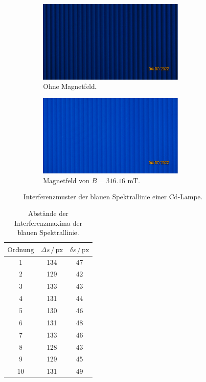 \begin{figure}[H]
	\centering
	\begin{subfigure}[b]{0.8\textwidth}
		\centering
		\includegraphics[width=0.8\textwidth]{data/blau1.JPG}
		\caption{Ohne Magnetfeld.}
    \label{fig:blau1}
	\end{subfigure}
	
	\begin{subfigure}[b]{0.8\textwidth}
		\centering
		\includegraphics[width=0.8\textwidth]{data/blau1b.JPG}
		\caption{Magnetfeld von $B= 316.16$ mT.}
    \label{fig:rot1b}
	\end{subfigure}
    \caption{Interferenzmuster der blauen Spektrallinie einer Cd-Lampe.}
\label{fig:blau}
\end{figure}


\begin{table}
    \centering
    \begin{tabular}{c c c}
    \toprule
    $\text{Ordnung}$ & $\Delta s \,/\, \text{px}$ & $\delta s \,/\, \text{px}$ \\
     \midrule 
     1 & 134 & 47 \\
     2 & 129 & 42 \\
     3 & 133 & 43 \\
     4 & 131 & 44 \\
     5 & 130 & 46 \\
     6 & 131 & 48 \\
     7 & 133 & 46 \\
     8 & 128 & 43 \\
     9 & 129 & 45 \\
     10 & 131 & 49 \\
    \bottomrule
    \end{tabular}
    \caption{Abstände der Interferenzmaxima der blauen Spektrallinie.}
    \label{tab:blau}
    \end{table}

